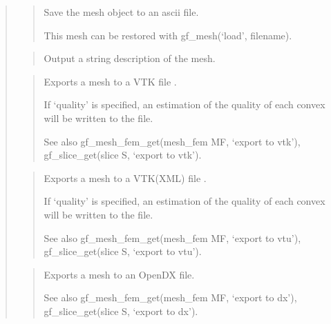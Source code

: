 \documentclass[a4paper,11pt,english]{sphinxmanual}
\begin{document}
\begin{quote}
\begin{quote}
Save the mesh object to an ascii file.

This mesh can be restored with gf\_mesh(‘load’, filename).
\end{quote}

\begin{quote}

Output a string description of the mesh.
\end{quote}

\begin{quote}

Exports a mesh to a VTK file .

If ‘quality’ is specified, an estimation of the quality of each
convex will be written to the file.

See also gf\_mesh\_fem\_get(mesh\_fem MF, ‘export to vtk’), gf\_slice\_get(slice S, ‘export to vtk’).
\end{quote}

\begin{quote}

Exports a mesh to a VTK(XML) file .

If ‘quality’ is specified, an estimation of the quality of each
convex will be written to the file.

See also gf\_mesh\_fem\_get(mesh\_fem MF, ‘export to vtu’), gf\_slice\_get(slice S, ‘export to vtu’).
\end{quote}

\begin{quote}

Exports a mesh to an OpenDX file.

See also gf\_mesh\_fem\_get(mesh\_fem MF, ‘export to dx’), gf\_slice\_get(slice S, ‘export to dx’).
\end{quote}


\end{quote}
\end{document}
